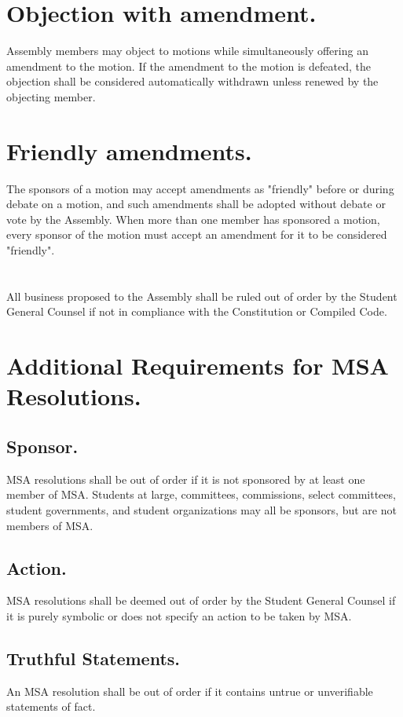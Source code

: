 \documentclass{rules}
\begin{document}
\section{Objection with amendment.}
Assembly members may object to motions while simultaneously offering an amendment to the motion.  If the amendment to the motion is defeated, the objection shall be considered automatically withdrawn unless renewed by the objecting member.

\section{Friendly amendments.}
The sponsors of a motion may accept amendments as "friendly" before or during debate on a motion, and such amendments shall be adopted without debate or vote by the Assembly.  When more than one member has sponsored a motion, every sponsor of the motion must accept an amendment for it to be considered "friendly".

\section{}
All business proposed to the Assembly shall be ruled out of order by the Student General Counsel if not in compliance with the Constitution or Compiled Code.

\section{Additional Requirements for MSA Resolutions.}
\subsection{Sponsor.}
MSA resolutions shall be out of order if it is not sponsored by at least one member of MSA.  Students at large, committees, commissions, select committees, student governments, and student organizations may all be sponsors, but are not members of MSA.
\subsection{Action.}
MSA resolutions shall be deemed out of order by the Student General Counsel if it is purely symbolic or does not specify an action to be taken by MSA.
\subsection{Truthful Statements.}
An MSA resolution shall be out of order if it contains untrue or unverifiable statements of fact.
\end{document}
